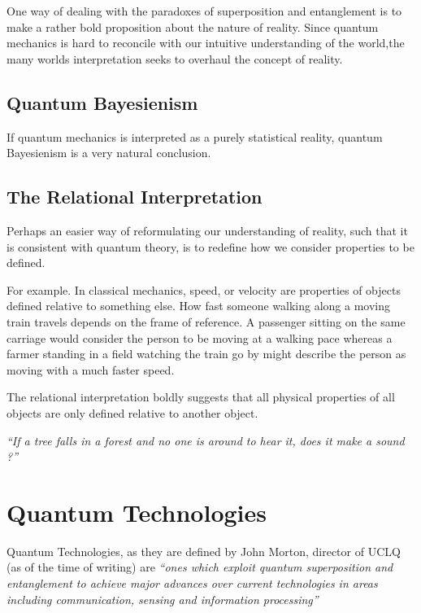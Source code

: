 \documentclass{book}
\begin{document}
One way of dealing with the paradoxes of superposition and entanglement is to make a rather bold proposition about the nature of reality. Since quantum mechanics is hard to reconcile with our intuitive understanding of the world,the many worlds interpretation seeks to overhaul the concept of reality.



\subsection{Quantum Bayesienism}

If quantum mechanics is interpreted as a purely statistical reality, quantum Bayesienism is a very natural conclusion. 

\subsection{The Relational Interpretation}

Perhaps an easier way of reformulating our understanding of reality, such that it is consistent with quantum theory, is to redefine how we consider properties to be defined. \newline

For example. In classical mechanics, speed, or velocity are properties of objects defined relative to something else. How fast someone walking along a moving train travels depends on the frame of reference. A passenger sitting on the same carriage would consider the person to be moving at a walking pace whereas a farmer standing in a field watching the train go by might describe the person as moving with a much faster speed. \newline

The relational interpretation boldly suggests that all physical properties of all objects are only defined relative to another object. 

\textit{``If a tree falls in a forest and no one is around to hear it, does it make a sound ?''}


\section{Quantum Technologies}

Quantum Technologies, as they are defined by John Morton, director of UCLQ (as of the time of writing) are \textit{ ``ones which exploit quantum superposition and entanglement to achieve major advances over current technologies in areas including communication, sensing and information processing'' }
\end{document}
